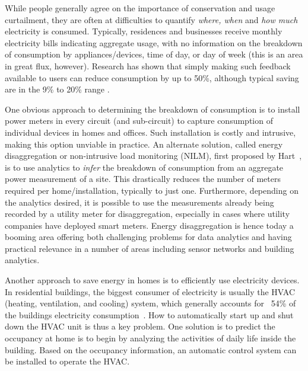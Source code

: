 While people generally agree on the importance of conservation and
usage curtailment, they are often at difficulties to quantify 
{\em where, when} and {\em how much} electricity is consumed.
Typically, residences and businesses receive
monthly electricity bills indicating aggregate usage, with no information on
the breakdown of consumption by appliances/devices, time of day, or day of
week (this is an area in great flux, however). Research has 
shown that simply making such feedback available to users
can reduce consumption by up to 50\%, although typical saving 
are in the 9\% to 20\% range \cite{book2014us}.%

One obvious approach to determining the breakdown of consumption is to install
power meters in every circuit (and sub-circuit)
to capture consumption of individual devices in homes and
offices. Such installation is costly and intrusive, making 
this option unviable in practice. 
An alternate
solution, called energy disaggregation or non-intrusive load monitoring
(NILM),
first proposed by Hart~\cite{hart1992}, is to use analytics to 
{\em infer} the breakdown of consumption from an aggregate 
power measurement of a
site. This drastically reduces the number of meters required per 
home/installation, typically to just one. Furthermore, depending on the analytics desired, it is possible to
use the measurements already being recorded by a utility meter for
disaggregation, especially in cases where utility companies have deployed
smart meters.
Energy disaggregation is hence today a booming area offering both
challenging problems for data analytics and having practical relevance in a
number of areas including sensor networks and building analytics.

Another approach to save energy in homes is to 
efficiently use electricity devices.  
In residential buildings, 
the biggest consumer of electricity is usually the HVAC 
(heating, ventilation, and cooling) system, which generally accounts for ~54\% 
of the buildings electricity consumption~\cite{book2014us}. 
How to automatically start up and shut down the HVAC unit 
is thus a key problem. 
One solution is to predict the occupancy at home 
is to begin by analyzing the activities of daily life 
inside the building. 
Based on the occupancy information, 
an automatic control system can be installed
to operate the HVAC. 

